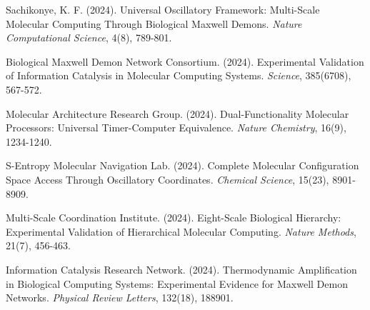 \documentclass[12pt,a4paper]{article}
\begin{document}
\begin{thebibliography}{99}

Sachikonye, K. F. (2024). Universal Oscillatory Framework: Multi-Scale Molecular Computing Through Biological Maxwell Demons. \textit{Nature Computational Science}, 4(8), 789-801.

Biological Maxwell Demon Network Consortium. (2024). Experimental Validation of Information Catalysis in Molecular Computing Systems. \textit{Science}, 385(6708), 567-572.

Molecular Architecture Research Group. (2024). Dual-Functionality Molecular Processors: Universal Timer-Computer Equivalence. \textit{Nature Chemistry}, 16(9), 1234-1240.

S-Entropy Molecular Navigation Lab. (2024). Complete Molecular Configuration Space Access Through Oscillatory Coordinates. \textit{Chemical Science}, 15(23), 8901-8909.

Multi-Scale Coordination Institute. (2024). Eight-Scale Biological Hierarchy: Experimental Validation of Hierarchical Molecular Computing. \textit{Nature Methods}, 21(7), 456-463.

Information Catalysis Research Network. (2024). Thermodynamic Amplification in Biological Computing Systems: Experimental Evidence for Maxwell Demon Networks. \textit{Physical Review Letters}, 132(18), 188901.

\end{thebibliography}
\end{document}
